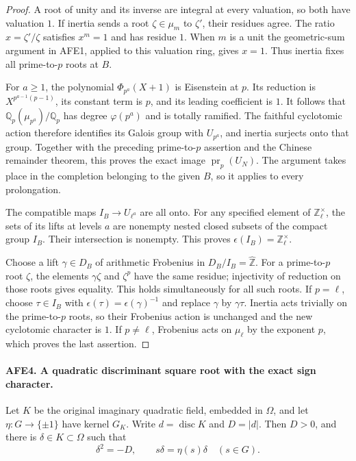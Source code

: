 \begin{proof}
A root of unity and its inverse are integral at every
valuation, so both have valuation \(1\).
If inertia sends a root \(\zeta\in\mu_m\) to \(\zeta'\),
their residues agree.  The ratio \(x=\zeta'/\zeta\)
satisfies \(x^m=1\) and has residue \(1\).
When \(m\) is a unit the geometric-sum argument in
AFE1, applied to this valuation ring, gives \(x=1\).
Thus inertia fixes all prime-to-\(p\) roots at \(B\).

For \(a\ge1\), the polynomial
\(\Phi_{p^a}(X+1)\) is Eisenstein at \(p\).
Its reduction is \(X^{p^{a-1}(p-1)}\), its constant
term is \(p\), and its leading coefficient is \(1\).
It follows that \(\mathbb Q_p(\mu_{p^a})/\mathbb Q_p\)
has degree \(\varphi(p^a)\) and is totally ramified.
The faithful cyclotomic action therefore identifies its
Galois group with \(U_{p^a}\), and inertia surjects onto
that group.  Together with the preceding prime-to-\(p\)
assertion and the Chinese remainder theorem, this proves
the exact image \(\operatorname{pr}_p(U_N)\).
The argument takes place in the completion belonging to
the given \(B\), so it applies to every prolongation.

The compatible maps \(I_B\to U_{\ell^a}\) are all onto.
For any specified element of \(\mathbb Z_\ell^\times\),
the sets of its lifts at levels \(a\) are nonempty nested
closed subsets of the compact group \(I_B\).
Their intersection is nonempty.  This proves
\(\epsilon(I_B)=\mathbb Z_\ell^\times\).

Choose a lift \(\gamma\in D_B\) of arithmetic Frobenius
in \(D_B/I_B=\widehat{\mathbb Z}\).
For a prime-to-\(p\) root \(\zeta\), the elements
\(\gamma\zeta\) and \(\zeta^p\) have the same residue;
injectivity of reduction on those roots gives equality.
This holds simultaneously for all such roots.
If \(p=\ell\), choose \(\tau\in I_B\) with
\(\epsilon(\tau)=\epsilon(\gamma)^{-1}\) and replace
\(\gamma\) by \(\gamma\tau\).  Inertia acts trivially
on the prime-to-\(p\) roots, so their Frobenius action
is unchanged and the new cyclotomic character is \(1\).
If \(p\ne\ell\), Frobenius acts on \(\mu_\ell\)
by the exponent \(p\), which proves the last assertion.
\end{proof}

\paragraph{AFE4. A quadratic discriminant square root with the exact sign character.}
\label{claim:AFE4}
Let \(K\) be the original imaginary quadratic field,
embedded in \(\Omega\), and let
\(\eta:G\to\{\pm1\}\) have kernel \(G_K\).
Write \(d=\operatorname{disc}K\) and \(D=|d|\).
Then \(D>0\), and there is \(\delta\in K\subset\Omega\)
such that
\[
       \delta^2=-D,\qquad s\delta=\eta(s)\delta
                          \quad(s\in G).                \tag{AFE.4}
\]

